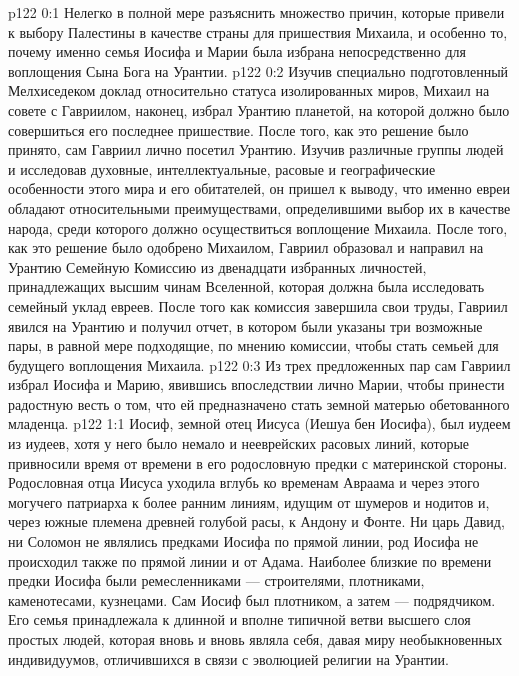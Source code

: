 \author{Комиссия срединников}
\vs p122 0:1 Нелегко в полной мере разъяснить множество причин, которые привели к выбору Палестины в качестве страны для пришествия Михаила, и особенно то, почему именно семья Иосифа и Марии была избрана непосредственно для воплощения Сына Бога на Урантии.
\vs p122 0:2 Изучив специально подготовленный Мелхиседеком доклад относительно статуса изолированных миров, Михаил на совете с Гавриилом, наконец, избрал Урантию планетой, на которой должно было совершиться его последнее пришествие. После того, как это решение было принято, сам Гавриил лично посетил Урантию. Изучив различные группы людей и исследовав духовные, интеллектуальные, расовые и географические особенности этого мира и его обитателей, он пришел к выводу, что именно евреи обладают относительными преимуществами, определившими выбор их в качестве народа, среди которого должно осуществиться воплощение Михаила. После того, как это решение было одобрено Михаилом, Гавриил образовал и направил на Урантию Семейную Комиссию из двенадцати избранных личностей, принадлежащих высшим чинам Вселенной, которая должна была исследовать семейный уклад евреев. После того как комиссия завершила свои труды, Гавриил явился на Урантию и получил отчет, в котором были указаны три возможные пары, в равной мере подходящие, по мнению комиссии, чтобы стать семьей для будущего воплощения Михаила.
\vs p122 0:3 Из трех предложенных пар сам Гавриил избрал Иосифа и Марию, явившись впоследствии лично Марии, чтобы принести радостную весть о том, что ей предназначено стать земной матерью обетованного младенца.
\vs p122 1:1 Иосиф, земной отец Иисуса (Иешуа бен Иосифа), был иудеем из иудеев, хотя у него было немало и нееврейских расовых линий, которые привносили время от времени в его родословную предки с материнской стороны. Родословная отца Иисуса уходила вглубь ко временам Авраама и через этого могучего патриарха к более ранним линиям, идущим от шумеров и нодитов и, через южные племена древней голубой расы, к Андону и Фонте. Ни царь Давид, ни Соломон не являлись предками Иосифа по прямой линии, род Иосифа не происходил также по прямой линии и от Адама. Наиболее близкие по времени предки Иосифа были ремесленниками --- строителями, плотниками, каменотесами, кузнецами. Сам Иосиф был плотником, а затем --- подрядчиком. Его семья принадлежала к длинной и вполне типичной ветви высшего слоя простых людей, которая вновь и вновь являла себя, давая миру необыкновенных индивидуумов, отличившихся в связи с эволюцией религии на Урантии.
